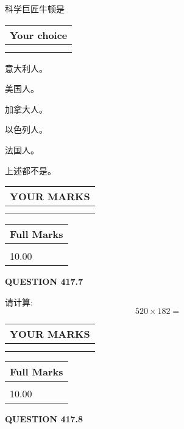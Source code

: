 \documentclass{ctexart}
\begin{document}
  
科学巨匠牛顿是
  
  
\noindent\hspace{3.0in} \begin{tabular}{|l|}
\hline
Your choice \\
\hline
 \\ 
 \\ 
\hline
\end{tabular}
  
  
 
 
意大利人。
 
 
美国人。
 
 
加拿大人。
 
 
以色列人。
 
 
法国人。
 
 
 上述都不是。
 
 
  
\vspace{0.2in}
  
\noindent\begin{tabular}{|l|}
\hline
 YOUR MARKS  \\
\hline
 \\ 
 \\ 
\hline
\end{tabular}
\hspace{0.05in} \begin{tabular}{|l|}
\hline
 Full Marks  \\
\hline
 \\ 
10.00 \\
\hline
\end{tabular}
{\textbf{\Large{QUESTION
417.7 
}}}
  
  
 
请计算:
\begin{equation}
520  \times    %
182 = \nonumber
\end{equation}
 

 

 
  
\vspace{0.2in}
  
\noindent\begin{tabular}{|l|}
\hline
 YOUR MARKS  \\
\hline
 \\ 
 \\ 
\hline
\end{tabular}
\hspace{0.05in} \begin{tabular}{|l|}
\hline
 Full Marks  \\
\hline
 \\ 
10.00 \\
\hline
\end{tabular}
{\textbf{\Large{QUESTION
417.8 
}}}
  
\end{document}
